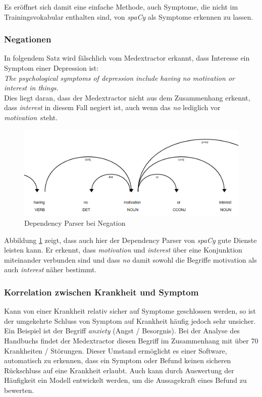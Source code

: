 Es eröffnet sich damit eine einfache Methode, auch Symptome, die nicht im Trainingsvokabular enthalten sind, von \emph{spaCy} als Symptome erkennen zu lassen.

\subsubsection{Negationen}
\label{subsec: negations} 

In folgendem Satz wird fälschlich vom Medextractor erkannt, dass Interesse ein Symptom einer Depression ist:\\

\emph{\glqq The psychological symptoms of depression include having no motivation or interest in things.\grqq}\\

Dies liegt daran, dass der Medextractor nicht aus dem Zusammenhang erkennt, dass \emph{interest} in diesem Fall negiert ist, auch wenn das \emph{no} lediglich vor \emph{motivation}\ steht. 

\begin{figure}[h]
    \centering
    \includegraphics[width=\textwidth]{pictures/Dep_Parser_Negation.png}
    \caption{Dependency Parser bei Negation}
    \label{fig:negation}
\end{figure}

Abbildung \ref{fig:negation} zeigt, dass auch hier der Dependency Parser von \emph{spaCy} gute Dienste leisten kann. Er erkennt, dass \emph{motivation} und \emph{interest} über eine Konjunktion miteinander verbunden sind und dass \emph{no} damit sowohl die Begriffe {motivation} als auch \emph{interest} näher bestimmt.

\subsubsection{Korrelation zwischen Krankheit und Symptom}
\label{subsec: stigmatisierung} 

Kann von einer Krankheit relativ sicher auf Symptome geschlossen werden, so ist der umgekehrte Schluss von Symptom auf Krankheit häufig jedoch sehr unsicher. Ein Beispiel ist der Begriff \emph{anxiety} (Angst / Besorgnis). Bei der Analyse des Handbuchs findet der Medextractor diesen Begriff im Zusammenhang mit über 70 Krankheiten / Störungen. Dieser Umstand ermöglicht es einer Software, automatisch zu erkennen, dass ein Symptom oder Befund keinen sicheren Rückschluss auf eine Krankheit erlaubt. Auch kann durch Auswertung der Häufigkeit ein Modell entwickelt werden, um die Aussagekraft eines Befund zu bewerten.

